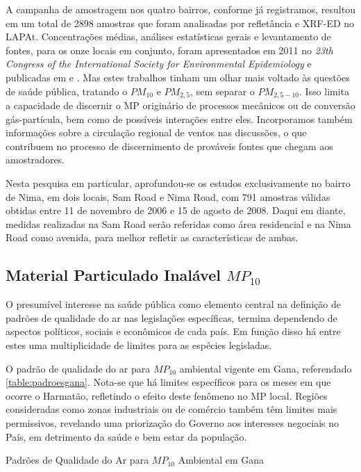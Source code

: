 A campanha de amostragem nos quatro bairros, conforme já registramos, 
resultou em um total de 2898 amostras que foram analisadas por refletância e 
XRF-ED no LAPAt. Concentrações médias, análises estatísticas gerais e 
levantamento de fontes, para os onze locais em conjunto, foram apresentados em 
2011 no \textit{23th Congress of the International Society 
for Environmental Epidemiology} \citep{zhou2011} e publicadas em \cite{zhou2013} 
e \cite{zhou2014}. Mas estes trabalhos tinham um olhar mais voltado às questões
de saúde pública, tratando o  $PM_{10}$ e $PM_{2,5}$, sem separar o 
$PM_{2,5-10}$. Isso limita a capacidade de discernir o MP originário de 
processos mecânicos ou de conversão gás-partícula, bem como de possíveis 
interações entre eles. Incorporamos também informações sobre a circulação 
regional de ventos nas discussões, o que contribuem no processo de discernimento
de prováveis fontes que chegam aos amostradores.

Nesta pesquisa em particular, aprofundou-se os estudos exclusivamente no bairro
de Nima, em dois locais, Sam Road e Nima Road, com 791 amostras válidas obtidas
entre 11 de novembro de 2006 e 15 de agosto de 2008. Daqui em diante, 
medidas realizadas na Sam Road serão referidas como área residencial e na 
Nima Road como avenida, para melhor refletir as características de ambas.

\newpage
\subsection{Material Particulado Inalável $MP_{10}$}

O presumível interesse na saúde pública como elemento central na definição 
de padrões de qualidade do ar nas legislações específicas, termina dependendo 
de aspectos políticos, sociais e econômicos de cada país. Em função disso há 
entre estes uma multiplicidade de limites para as espécies legisladas.

O padrão de qualidade do ar para $MP_{10}$ ambiental vigente em Gana, referendado
\ref{table:padroesgana}. Nota-se que há limites específicos para os meses em que 
ocorre o Harmatão, refletindo o efeito deste fenômeno no MP local. 
Regiões consideradas como zonas industriais ou de comércio também têm limites mais
permissivos, revelando uma priorização do Governo aos interesses negociais no 
País, em detrimento da saúde e bem estar da população.

\begin{table}[H]
\centering
  
\caption{Padrões de Qualidade do Ar para $MP_{10}$ Ambiental em Gana
         \cite{epa2015} \label{table:padroesgana}}
\end{table}



